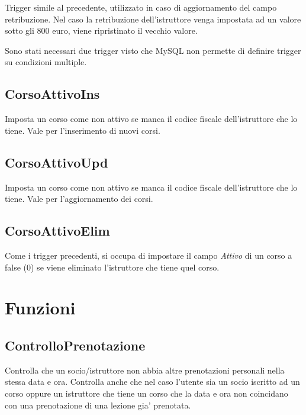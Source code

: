Trigger simile al precedente, utilizzato in caso di aggiornamento del campo retribuzione. Nel caso la retribuzione dell'istruttore venga impostata ad un valore sotto gli 800 euro, viene ripristinato il vecchio valore.

Sono stati necessari due trigger visto che MySQL non permette di definire trigger su condizioni multiple.

\subsection{CorsoAttivoIns}


Imposta un corso come non attivo se manca il codice fiscale dell'istruttore che lo tiene. Vale per l'inserimento di nuovi corsi.

\subsection{CorsoAttivoUpd}



Imposta un corso come non attivo se manca il codice fiscale dell'istruttore che lo tiene. Vale per l'aggiornamento dei corsi.

\newpage
\subsection{CorsoAttivoElim}



Come i trigger precedenti, si occupa di impostare il campo \textit{Attivo} di un corso a false (0) se viene eliminato l'istruttore che tiene quel corso.

\section{Funzioni}

\subsection{ControlloPrenotazione}



Controlla che un socio/istruttore non abbia altre prenotazioni personali nella stessa data e ora.
Controlla anche che nel caso l'utente sia un socio iscritto ad un corso oppure un istruttore che tiene un corso che la data e ora non coincidano con una prenotazione di una lezione gia' prenotata.

